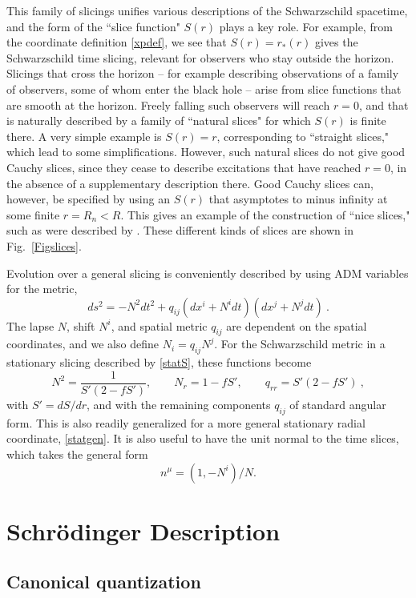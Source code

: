\documentclass[12pt]{article}
\numberwithin{equation}{section}
\newcommand{\beq}{\begin{equation}}
\newcommand{\eeq}{\end{equation}}
\begin{document}
This family of slicings unifies various descriptions of the Schwarzschild spacetime, and the form of the ``slice function" $S(r)$ plays a key role.  For example, from the coordinate definition \eqref{xpdef}, we see that $S(r)=r_*(r)$ gives the Schwarzschild time slicing, relevant for observers who stay outside the horizon.  Slicings that cross the horizon -- for example describing observations of a family of observers, some of whom enter the black hole -- arise from slice functions that are smooth at the horizon.  Freely falling such observers will reach $r=0$, and that is naturally described by a family of ``natural slices" for which $S(r)$ is finite there.  A very simple example is $S(r)=r$, corresponding to ``straight slices,"  which lead to some simplifications.  However, such natural slices do not give good Cauchy slices, since they cease to describe excitations that have reached $r=0$, in the absence of a supplementary description there.  Good Cauchy slices can, however, be specified by using an $S(r)$ that asymptotes to minus infinity at some finite $r=R_n<R$.  This gives an example of the construction of ``nice slices," such as were described by \cite{Waldnice,LPSTU}.  These different kinds of slices are shown in Fig.~\ref{Figslices}.


Evolution over a general  slicing is conveniently described by using ADM variables\cite{ADM} for the metric,
\beq
\label{ADMmet}
ds^2 = -N^2 dt^2 +q_{ij}(dx^i + N^i dt)(dx^j + N^j dt)\ .
\eeq
The lapse $N$, shift $N^i$, and spatial metric $q_{ij}$ are dependent on the spatial coordinates, and we also define
$N_i =q_{ij} N^j$. For the Schwarzschild metric in a stationary slicing described by \eqref{statS}, these functions become\cite{NVU}
\beq\label{ADMvar}
N^2 = \frac{1}{S'(2-f S')},\quad \quad N_r = 1-f S',\quad\quad q_{rr} = S'(2-f S')\ ,
\eeq
with $S'=dS/dr$, and
with the remaining components $q_{ij}$ of standard angular form.  This is also readily generalized for a more general stationary radial coordinate, 
\eqref{statgen}.
It is also useful to have the unit normal to the time slices, which takes the general form 
\beq\label{normdef}
n^{\mu} = (1,-N^i)/N .
\eeq


\section{Schr\"odinger Description}
\label{Schsec}

\subsection{Canonical quantization}
\end{document}
